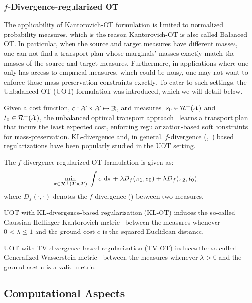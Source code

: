 \subsubsection{$f$-Divergence-regularized OT}
The applicability of Kantorovich-OT formulation is limited to normalized probability measures, which is the reason Kantorovich-OT is also called Balanced OT. In particular, when the source and target measures have different masses, one can not find a transport plan whose marginals' masses exactly match the masses of the source and target measures. Furthermore, in applications where one only has access to empirical measures, which could be noisy, one may not want to enforce these mass-preservation constraints exactly. To cater to such settings, the Unbalanced OT (UOT) formulation was introduced, which we will detail below.


Given a cost function, $c:\mathcal{X}\times\mathcal{X}\mapsto\mathbb{R}$, and measures, $s_0\in \mathcal{R}^+(\mathcal{X})$ and $t_0\in \mathcal{R}^+(\mathcal{X})$, the unbalanced optimal transport approach~\citep{Liero2018,chizat17,chizat18a} learns a transport plan that incurs the least expected cost, enforcing regularization-based soft constraints for mass-preservation. KL-divergence and, in general, $f$-divergence (\citep{Csiszar67},~\citep{Sriperumbudur09onintegral}) based regularizations have been popularly studied in the UOT setting. 
\begin{definition}
The $f$-divergence regularized OT formulation \citep[Eq. (2.4)]{chizat17} is given as:
\begin{equation}\label{bgeqn:uot}
\min\limits_{\pi\in\calR^+\left(\calX\times\calX\right)}\ \int c\ \textup{d}\pi + \lambda D_f(\pi_1,s_0) + \lambda D_f(\pi_2,t_0),
\end{equation}
where $D_f(\cdot,\cdot)$ denotes the $f$-divergence (\citep{Csiszar67,Sriperumbudur09onintegral}) between two measures.
\end{definition}

UOT with KL-divergence-based regularization (KL-OT) induces the so-called Gaussian Hellinger-Kantorovich metric~\citep{Liero2018} between the measures whenever $0<\lambda\leq 1$ and the ground cost $c$ is the squared-Euclidean distance.

UOT with TV-divergence-based regularization (TV-OT) induces the so-called Generalized Wasserstein metric~\citep{Piccoli2014GeneralizedWD} between the measures whenever $\lambda>0$ and the ground cost $c$ is a valid metric.
\resumetoc
\subsection{Computational Aspects}\label{bg:comp}
\stoptoc
